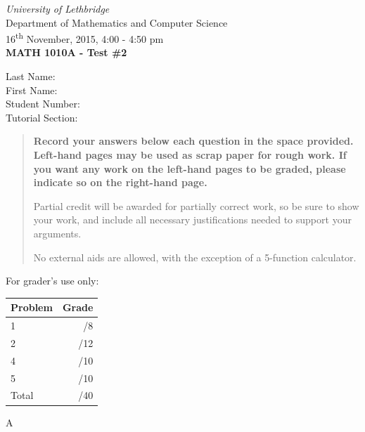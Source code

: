 \documentclass[12pt]{article}
\newcommand{\skipline}{\vspace{12pt}}
\begin{document}
\author{Instructor: Sean Fitzpatrick}
\thispagestyle{plain}
\begin{center}
\emph{University of Lethbridge}\\
Department of Mathematics and Computer Science\\
16\textsuperscript{th} November, 2015, 4:00 - 4:50 pm\\
{\bf MATH 1010A - Test \#2}\\
\end{center}
\skipline \skipline \skipline \noindent \skipline
Last Name:\underline{\hspace{353pt}}\\
\skipline
First Name:\underline{\hspace{350pt}}\\
\skipline
Student Number:\underline{\hspace{323pt}}\\
\skipline
Tutorial Section: \underline{\hspace{320pt}}\\


\vspace{0.5in}


\begin{quote}
 {\bf Record your answers below each question in the space provided.    Left-hand pages may be used as scrap paper for rough work.  If you want any work on the left-hand pages to be graded, please indicate so on the right-hand page.
 
 \bigskip
 
Partial credit will be awarded for partially correct work, so be sure to show your work, and include all necessary justifications needed to support your arguments.

\bigskip

No external aids are allowed, with the exception of a 5-function calculator.}
\end{quote}


\vspace{0.5in}

For grader's use only:

\begin{table}[hbt]
\begin{center}
\begin{tabular}{|l|r|} \hline
Problem &Grade\\
\hline \hline
\cline{1-2} 1 & \enspace\enspace\enspace\enspace\enspace\enspace/8\\
\cline{1-2} 2 & \enspace\enspace\enspace\enspace\enspace\enspace/12\\
\cline{1-2} 4 & \enspace\enspace\enspace\enspace\enspace\enspace/10\\
\cline{1-2} 5 & \enspace\enspace\enspace\enspace\enspace\enspace/10\\
\cline{1-2} Total & \enspace\enspace\enspace\enspace\enspace\enspace/40\\
\hline
\end{tabular}

\skipline

\skipline

\skipline

A
\end{center}
\end{table}
\newpage
\end{document}
